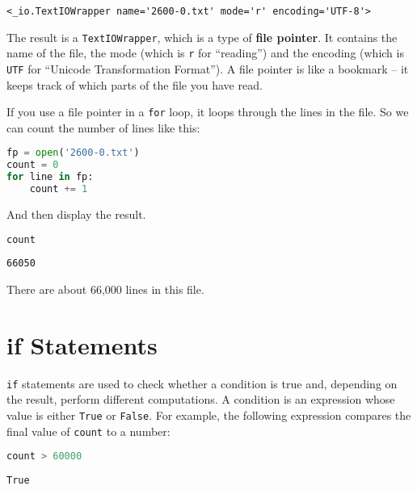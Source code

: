 \begin{lstlisting}[style=output]
<_io.TextIOWrapper name='2600-0.txt' mode='r' encoding='UTF-8'>
\end{lstlisting}

The result is a \passthrough{\lstinline!TextIOWrapper!}, which is a type
of \textbf{file pointer}. It contains the name of the file, the mode
(which is \passthrough{\lstinline!r!} for ``reading'') and the encoding
(which is \passthrough{\lstinline!UTF!} for ``Unicode Transformation
Format''). A file pointer is like a bookmark -- it keeps track of which
parts of the file you have read.

If you use a file pointer in a \passthrough{\lstinline!for!} loop, it
loops through the lines in the file. So we can count the number of lines
like this:

\begin{lstlisting}[language=Python,style=source]
fp = open('2600-0.txt')
count = 0
for line in fp:
    count += 1
\end{lstlisting}

And then display the result.

\begin{lstlisting}[language=Python,style=source]
count
\end{lstlisting}

\begin{lstlisting}[style=output]
66050
\end{lstlisting}

There are about 66,000 lines in this file.

\section{if Statements}\label{if-statements}

\passthrough{\lstinline!if!} statements are used to check whether a
condition is true and, depending on the result, perform different
computations. A condition is an expression whose value is either
\passthrough{\lstinline!True!} or \passthrough{\lstinline!False!}. For
example, the following expression compares the final value of
\passthrough{\lstinline!count!} to a number:

\begin{lstlisting}[language=Python,style=source]
count > 60000
\end{lstlisting}

\begin{lstlisting}[style=output]
True
\end{lstlisting}

